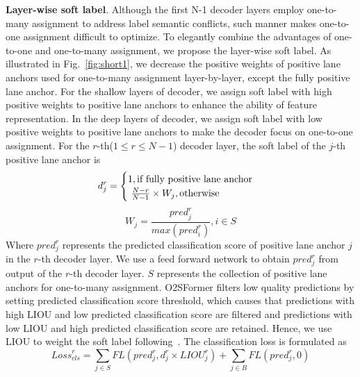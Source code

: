 \documentclass{bmvc2k}
\begin{document}
{\bf Layer-wise soft label}. Although the first N-1 decoder layers employ one-to-many assignment to 
address label semantic conflicts, such manner makes one-to-one assignment difficult to optimize. 
To elegantly combine the advantages of one-to-one and one-to-many assignment, we propose the 
layer-wise soft label. As illustrated in Fig.~\ref{fig:short1}, we decrease the positive weights of positive lane anchors used for one-to-many assignment
layer-by-layer, except the fully positive lane anchor. For the shallow layers of decoder, 
we assign soft label with high positive weights to positive lane anchors to enhance 
the ability of feature representation. In the deep layers of decoder, we assign soft label with low 
positive weights to positive lane anchors to make the decoder focus on one-to-one assignment. For the $r$-th($1 \leq r \leq N-1$) decoder layer, the soft label of the $j$-th positive lane anchor is
\vspace{-0.23cm}
\begin{equation}\label{eqn-8} 
   \vspace{-0.39cm}
   d_j^r=\begin{cases}
                1, \text{if fully positive lane anchor} \\
               \ \frac{N-r}{N-1}\times W_j, \text{otherwise} \\
            \end{cases}
 \end{equation}
\vspace{0.05cm}
\begin{equation}\label{eqn-9} 
   W_j=\frac{{pred}_j^r}{max\left({pred}_i^r\right)},i\in S
 \end{equation}
Where $pred_{j}^r$ represents the predicted classification score of positive lane anchor $j$ in the $r$-th decoder layer. We use a feed forward network to obtain $pred_{j}^r$ from output of the $r$-th decoder layer.
$S$ represents the collection of positive lane anchors for one-to-many assignment.
O2SFormer filters low quality predictions by setting predicted classification score threshold, which causes that predictions with 
high LIOU and low predicted classification score are filtered and predictions with low LIOU 
and high predicted classification score are retained. Hence, we use LIOU to weight the soft label following~\cite{zhang2021varifocalnet}. 
The classification loss is formulated as
\vspace{-0.15cm}
 \begin{equation}\label{eqn-10} 
   {Loss}_{cls}^r=\sum_{j\in S}{FL(pred_j^r,d_j^r\times LIOU_j^r)+\sum_{j\in B}{FL(pred_j^r,0)}}  
 \end{equation}
\end{document}
